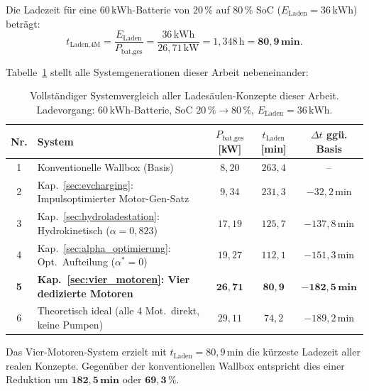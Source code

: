 ﻿\documentclass[a4paper,12pt]{article}
\begin{document}
Die Ladezeit für eine $60\,\text{kWh}$-Batterie von $20\,\%$ auf $80\,\%$
SoC ($E_\text{Laden} = 36\,\text{kWh}$) beträgt:
\begin{equation}
  t_\text{Laden,4M}
    = \frac{E_\text{Laden}}{P_\text{bat,ges}}
    = \frac{36\,\text{kWh}}{26{,}71\,\text{kW}}
    = 1{,}348\,\text{h}
    = \mathbf{80{,}9\,\text{min}}.
  \label{eq:t_laden_4mot}
\end{equation}

Tabelle~\ref{tab:vier_motoren_vergleich} stellt alle Systemgenerationen
dieser Arbeit nebeneinander:

\begin{table}
  \centering
  \caption{Vollständiger Systemvergleich aller Ladesäulen-Konzepte dieser Arbeit.
    Ladevorgang: $60\,\text{kWh}$-Batterie, SoC $20\,\%\to80\,\%$,
    $E_\text{Laden} = 36\,\text{kWh}$.}
  \label{tab:vier_motoren_vergleich}
  \begin{tabular}{clccc}
    \toprule
    \textbf{Nr.} &
    \textbf{System} &
    $P_\text{bat,ges}$ [kW] &
    $t_\text{Laden}$ [min] &
    $\Delta t$ ggü. Basis \\
    \midrule
    1 & Konventionelle Wallbox (Basis)
      & $8{,}20$ & $263{,}4$ & -- \\
    2 & Kap.~\ref{sec:evcharging}: Impulsoptimierter Motor-Gen-Satz
      & $9{,}34$ & $231{,}3$ & $-32{,}2\,\text{min}$ \\
    3 & Kap.~\ref{sec:hydroladestation}: Hydrokinetisch ($\alpha=0{,}823$)
      & $17{,}19$ & $125{,}7$ & $-137{,}8\,\text{min}$ \\
    4 & Kap.~\ref{sec:alpha_optimierung}: Opt.\ Aufteilung ($\alpha^*=0$)
      & $19{,}27$ & $112{,}1$ & $-151{,}3\,\text{min}$ \\
    \midrule
    \textbf{5} &
    \textbf{Kap.~\ref{sec:vier_motoren}: Vier dedizierte Motoren}
      & $\mathbf{26{,}71}$ & $\mathbf{80{,}9}$ &
      $\mathbf{-182{,}5\,\text{min}}$ \\
    \midrule
    6 & Theoretisch ideal (alle 4 Mot.\ direkt, keine Pumpen)
      & $29{,}11$ & $74{,}2$ & $-189{,}2\,\text{min}$ \\
    \bottomrule
  \end{tabular}
\end{table}

Das Vier-Motoren-System erzielt mit $t_\text{Laden} = 80{,}9\,\text{min}$
die kürzeste Ladezeit aller realen Konzepte. Gegenüber der konventionellen
Wallbox entspricht dies einer Reduktion um $\mathbf{182{,}5\,\text{min}}$
oder $\mathbf{69{,}3\,\%}$.
\end{document}
